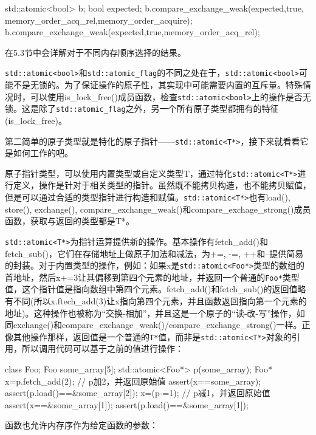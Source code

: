 \begin{cpp}
std::atomic<bool> b;
bool expected;
b.compare_exchange_weak(expected,true,
  memory_order_acq_rel,memory_order_acquire);
b.compare_exchange_weak(expected,true,memory_order_acq_rel);
\end{cpp}

在5.3节中会详解对于不同内存顺序选择的结果。

\texttt{std::atomic<bool>}和\texttt{std::atomic\_flag}的不同之处在于，\texttt{std::atomic<bool>}可能不是无锁的。为了保证操作的原子性，其实现中可能需要内置的互斥量。特殊情况时，可以使用is\_lock\_free()成员函数，检查\texttt{std::atomic<bool>}上的操作是否无锁。这是除了\texttt{std::atomic\_flag}之外，另一个所有原子类型都拥有的特征(is\_lock\_free)。

第二简单的原子类型就是特化的原子指针——\texttt{std::atomic<T*>}，接下来就看看它是如何工作的吧。


原子指针类型，可以使用内置类型或自定义类型T，通过特化\texttt{std::atomic<T*>}进行定义，操作是针对于相关类型的指针。虽然既不能拷贝构造，也不能拷贝赋值，但是可以通过合适的类型指针进行构造和赋值。\texttt{std::atomic<T*>}也有load(), store(), exchange(), compare\_exchange\_weak()和compare\_exchage\_strong()成员函数，获取与返回的类型都是T*。

\texttt{std::atomic<T*>}为指针运算提供新的操作。基本操作有fetch\_add()和fetch\_sub()，它们在存储地址上做原子加法和减法，为+=, -=, ++和--提供简易的封装。对于内置类型的操作，例如：如果x是\texttt{std::atomic<Foo*>}类型的数组的首地址，然后x+=3让其偏移到第四个元素的地址，并返回一个普通的\texttt{Foo*}类型值，这个指针值是指向数组中第四个元素。fetch\_add()和fetch\_sub()的返回值略有不同(所以x.ftech\_add(3)让x指向第四个元素，并且函数返回指向第一个元素的地址)。这种操作也被称为“交换-相加”，并且这是一个原子的“读-改-写”操作，如同exchange()和compare\_exchange\_weak()/compare\_exchange\_strong()一样。正像其他操作那样，返回值是一个普通的\texttt{T*}值，而非是\texttt{std::atomic<T*>}对象的引用，所以调用代码可以基于之前的值进行操作：

\begin{cpp}
class Foo{};
Foo some_array[5];
std::atomic<Foo*> p(some_array);
Foo* x=p.fetch_add(2);  // p加2，并返回原始值
assert(x==some_array);
assert(p.load()==&some_array[2]);
x=(p-=1);  // p减1，并返回原始值
assert(x==&some_array[1]);
assert(p.load()==&some_array[1]);
\end{cpp}

函数也允许内存序作为给定函数的参数：

